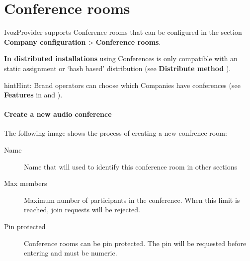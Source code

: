 \documentclass[letterpaper,10pt,english]{sphinxmanual}
\begin{document}
\section{Conference rooms}
\label{company/conference_rooms::doc}\label{company/conference_rooms:conference-rooms}\label{company/conference_rooms:id1}
IvozProvider supports Conference rooms that can be configured in the section
\textbf{Company configuration} \textgreater{} \textbf{Conference rooms}.

\textbf{In distributed installations} using Conferences is only compatible with an static
assignment or `hash based' distribution (see \textbf{Distribute method} {\hyperref[brand/virtual_pbx:virtual\string-pbx]{}}).

\begin{notice}{hint}{Hint:}
Brand operators can choose which Companies have conferences (see \textbf{Features}
in {\hyperref[brand/index:brand\string-configuration]{}} and {\hyperref[company/index:company\string-configuration]{}}).
\end{notice}
\paragraph{Create a new audio conference}

The following image shows the process of creating a new confrence room:

\noindent{}
\begin{description}
\item[{Name}] \leavevmode{}\label{company/conference_rooms:term-name}
Name that will used to identify this conference room in other sections

\item[{Max members}] \leavevmode{}\label{company/conference_rooms:term-max-members}
Maximum number of participants in the conference. When this limit is
reached, join requests will be rejected.

\item[{Pin protected}] \leavevmode{}\label{company/conference_rooms:term-pin-protected}
Conference rooms can be pin protected. The pin will be requested before
entering and must be numeric.

\end{description}
\end{document}
